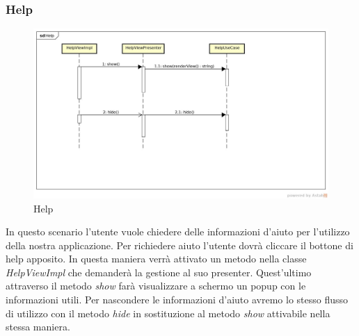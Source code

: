 \subsubsection{Help}

\label{Help}
\begin{figure}[H]
	\centering
	\includegraphics[width=\textwidth]{Sezioni/Diagrammi/img_app/Help.jpg}
	\caption{Help}
	
\end{figure}

In questo scenario l'utente vuole chiedere delle informazioni d'aiuto per l'utilizzo della nostra applicazione. Per richiedere aiuto l'utente dovrà cliccare il bottone di help apposito. In questa maniera verrà attivato un metodo nella classe \textit{HelpViewImpl} che demanderà la gestione al suo presenter. Quest'ultimo attraverso il metodo \textit{show} farà visualizzare a schermo un popup con le informazioni utili. Per nascondere le informazioni d'aiuto avremo lo stesso flusso di utilizzo con il metodo \textit{hide} in sostituzione al metodo \textit{show} attivabile nella stessa maniera.
